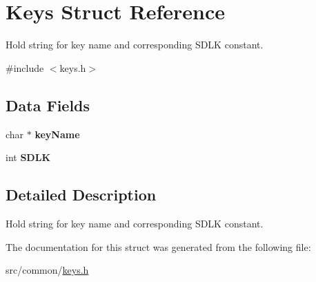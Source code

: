 \hypertarget{struct_keys}{}\section{Keys Struct Reference}
\label{struct_keys}


Hold string for key name and corresponding S\+D\+LK constant.  




{\ttfamily \#include $<$keys.\+h$>$}

\subsection*{Data Fields}
\begin{DoxyCompactItemize}
\item 
\mbox{\label{struct_keys_ab79a3ac2679b3523c1f53040e820052b}} 
char $\ast$ {\bfseries key\+Name}
\item 
\mbox{\label{struct_keys_a9c6ac273bb07ac0d6dd7cd4c66dfd0ed}} 
int {\bfseries S\+D\+LK}
\end{DoxyCompactItemize}


\subsection{Detailed Description}
Hold string for key name and corresponding S\+D\+LK constant. 

The documentation for this struct was generated from the following file\+:\begin{DoxyCompactItemize}
\item 
src/common/\hyperlink{keys_8h}{keys.\+h}\end{DoxyCompactItemize}
